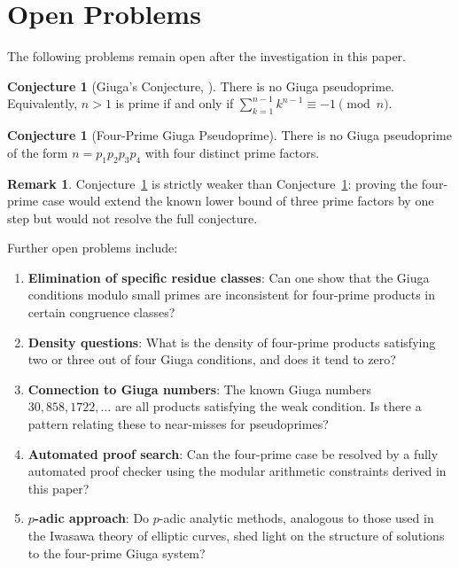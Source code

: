 \documentclass[12pt,a4paper]{amsart}
\theoremstyle{definition}
\newtheorem{remark}[theorem]{Remark}
\newtheorem{conjecture}[theorem]{Conjecture}
\begin{document}
\section{Open Problems}
\label{sec:open}

The following problems remain open after the investigation in this paper.

\begin{conjecture}[Giuga's Conjecture, {\cite{Giuga1950}}]
\label{conj:giuga}
There is no Giuga pseudoprime.  Equivalently, $n > 1$ is prime if and only if
$\sum_{k=1}^{n-1} k^{n-1} \equiv -1 \pmod{n}$.
\end{conjecture}

\begin{conjecture}[Four-Prime Giuga Pseudoprime]
\label{conj:fourprime}
There is no Giuga pseudoprime of the form $n = p_1 p_2 p_3 p_4$ with four
distinct prime factors.
\end{conjecture}

\begin{remark}
Conjecture~\ref{conj:fourprime} is strictly weaker than
Conjecture~\ref{conj:giuga}: proving the four-prime case would extend the
known lower bound of three prime factors by one step but would not resolve
the full conjecture.
\end{remark}

Further open problems include:

\begin{enumerate}
  \item \textbf{Elimination of specific residue classes}: Can one show that
        the Giuga conditions modulo small primes are inconsistent for four-prime
        products in certain congruence classes?
  \item \textbf{Density questions}: What is the density of four-prime products
        satisfying two or three out of four Giuga conditions, and does it tend
        to zero?
  \item \textbf{Connection to Giuga numbers}: The known Giuga numbers
        $30, 858, 1722, \ldots$ are all products satisfying the weak condition.
        Is there a pattern relating these to near-misses for pseudoprimes?
  \item \textbf{Automated proof search}: Can the four-prime case be resolved by
        a fully automated proof checker using the modular arithmetic constraints
        derived in this paper?
  \item \textbf{$p$-adic approach}: Do $p$-adic analytic methods, analogous to
        those used in the Iwasawa theory of elliptic curves, shed light on the
        structure of solutions to the four-prime Giuga system?
\end{enumerate}
\end{document}

